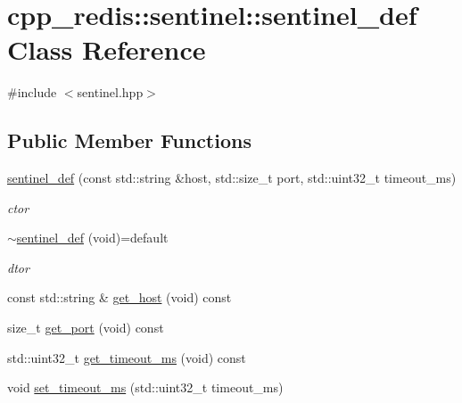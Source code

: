 \hypertarget{classcpp__redis_1_1sentinel_1_1sentinel__def}{}\section{cpp\+\_\+redis\+:\+:sentinel\+:\+:sentinel\+\_\+def Class Reference}
\label{classcpp__redis_1_1sentinel_1_1sentinel__def}


{\ttfamily \#include $<$sentinel.\+hpp$>$}

\subsection*{Public Member Functions}
\begin{DoxyCompactItemize}
\item 
\mbox{\label{classcpp__redis_1_1sentinel_1_1sentinel__def_a2d3116ce99ba2bd8c320ccc85901e5a1}} 
\mbox{\hyperlink{classcpp__redis_1_1sentinel_1_1sentinel__def_a2d3116ce99ba2bd8c320ccc85901e5a1}{sentinel\+\_\+def}} (const std\+::string \&host, std\+::size\+\_\+t port, std\+::uint32\+\_\+t timeout\+\_\+ms)
\begin{DoxyCompactList}\small\item\em ctor \end{DoxyCompactList}\item 
\mbox{\label{classcpp__redis_1_1sentinel_1_1sentinel__def_a5189d8016d9b385099e5ee0828ed7666}} 
\mbox{\hyperlink{classcpp__redis_1_1sentinel_1_1sentinel__def_a5189d8016d9b385099e5ee0828ed7666}{$\sim$sentinel\+\_\+def}} (void)=default
\begin{DoxyCompactList}\small\item\em dtor \end{DoxyCompactList}\item 
const std\+::string \& \mbox{\hyperlink{classcpp__redis_1_1sentinel_1_1sentinel__def_af61b33ea2b5154735e4b804039771f19}{get\+\_\+host}} (void) const
\item 
size\+\_\+t \mbox{\hyperlink{classcpp__redis_1_1sentinel_1_1sentinel__def_a1994bec14cc8703d1198de96b66a0f30}{get\+\_\+port}} (void) const
\item 
std\+::uint32\+\_\+t \mbox{\hyperlink{classcpp__redis_1_1sentinel_1_1sentinel__def_af7aa53bdf7bd56becdad9205e82949c5}{get\+\_\+timeout\+\_\+ms}} (void) const
\item 
void \mbox{\hyperlink{classcpp__redis_1_1sentinel_1_1sentinel__def_abc234e6c289f7b3d95868ae32343ff92}{set\+\_\+timeout\+\_\+ms}} (std\+::uint32\+\_\+t timeout\+\_\+ms)
\end{DoxyCompactItemize}


